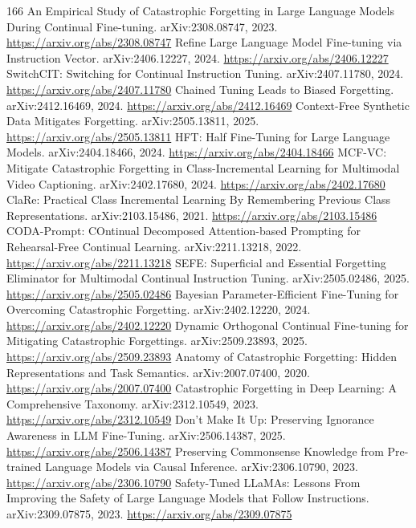 \documentclass[11pt]{article}
\begin{document}
\begin{thebibliography}{166}
 An Empirical Study of Catastrophic Forgetting in Large Language Models During Continual Fine-tuning. arXiv:2308.08747, 2023. \url{https://arxiv.org/abs/2308.08747}
 Refine Large Language Model Fine-tuning via Instruction Vector. arXiv:2406.12227, 2024. \url{https://arxiv.org/abs/2406.12227}
 SwitchCIT: Switching for Continual Instruction Tuning. arXiv:2407.11780, 2024. \url{https://arxiv.org/abs/2407.11780}
 Chained Tuning Leads to Biased Forgetting. arXiv:2412.16469, 2024. \url{https://arxiv.org/abs/2412.16469}
 Context-Free Synthetic Data Mitigates Forgetting. arXiv:2505.13811, 2025. \url{https://arxiv.org/abs/2505.13811}
 HFT: Half Fine-Tuning for Large Language Models. arXiv:2404.18466, 2024. \url{https://arxiv.org/abs/2404.18466}
 MCF-VC: Mitigate Catastrophic Forgetting in Class-Incremental Learning for Multimodal Video Captioning. arXiv:2402.17680, 2024. \url{https://arxiv.org/abs/2402.17680}
 ClaRe: Practical Class Incremental Learning By Remembering Previous Class Representations. arXiv:2103.15486, 2021. \url{https://arxiv.org/abs/2103.15486}
 CODA-Prompt: COntinual Decomposed Attention-based Prompting for Rehearsal-Free Continual Learning. arXiv:2211.13218, 2022. \url{https://arxiv.org/abs/2211.13218}
 SEFE: Superficial and Essential Forgetting Eliminator for Multimodal Continual Instruction Tuning. arXiv:2505.02486, 2025. \url{https://arxiv.org/abs/2505.02486}
 Bayesian Parameter-Efficient Fine-Tuning for Overcoming Catastrophic Forgetting. arXiv:2402.12220, 2024. \url{https://arxiv.org/abs/2402.12220}
 Dynamic Orthogonal Continual Fine-tuning for Mitigating Catastrophic Forgettings. arXiv:2509.23893, 2025. \url{https://arxiv.org/abs/2509.23893}
 Anatomy of Catastrophic Forgetting: Hidden Representations and Task Semantics. arXiv:2007.07400, 2020. \url{https://arxiv.org/abs/2007.07400}
 Catastrophic Forgetting in Deep Learning: A Comprehensive Taxonomy. arXiv:2312.10549, 2023. \url{https://arxiv.org/abs/2312.10549}
 Don't Make It Up: Preserving Ignorance Awareness in LLM Fine-Tuning. arXiv:2506.14387, 2025. \url{https://arxiv.org/abs/2506.14387}
 Preserving Commonsense Knowledge from Pre-trained Language Models via Causal Inference. arXiv:2306.10790, 2023. \url{https://arxiv.org/abs/2306.10790}
 Safety-Tuned LLaMAs: Lessons From Improving the Safety of Large Language Models that Follow Instructions. arXiv:2309.07875, 2023. \url{https://arxiv.org/abs/2309.07875}

\end{thebibliography}
\end{document}
